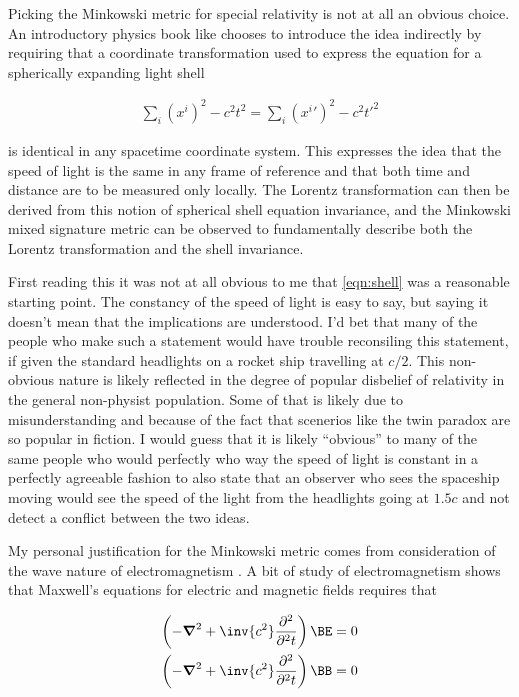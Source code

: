 \documentclass{article}      %
\newcommand{\spacegrad}[0]{\boldsymbol{\nabla}}
\newcommand{\PDsq}[2]{\frac{\partial^2 {#2}}{\partial^2 {#1}}}
\begin{document}
Picking the
Minkowski metric for special relativity is not at all an obvious 
choice.  An introductory physics book like \cite{lewis1965mbp} chooses
to introduce the idea indirectly by requiring that a coordinate transformation
used to express the equation for a spherically expanding light shell

\begin{align}\label{eqn:shell}
\sum_i (x^i)^2 - c^2 t^2 = \sum_i ({x^i}')^2 - c^2 {t'}^2
\end{align}

is identical in any spacetime coordinate system.  This expresses the idea that the speed
of light is the same in any frame of reference and that both time and distance
are to be measured only locally.  The Lorentz transformation can then be derived from
this notion of spherical shell equation invariance, and the Minkowski mixed signature
metric can be observed to fundamentally describe both the Lorentz transformation and the
shell invariance.

First reading this it was not at all obvious to me that \ref{eqn:shell} was a reasonable starting
point.  The constancy of the speed of light is easy to say, but saying it doesn't mean
that the implications are understood.  I'd bet that many of the people who make such a statement
would have trouble reconsiling this statement, if given the standard headlights on a rocket ship
travelling at $c/2$.
This non-obvious nature is likely reflected in the degree of popular disbelief of relativity in the general non-physist population.
Some of that is likely due to misunderstanding and because of the fact that scenerios like the twin paradox are so popular in fiction.
I would guess that it is likely ``obvious'' to many of the same people who would perfectly who way the speed of light is constant
in a perfectly agreeable fashion to also state that an observer who sees the spaceship
moving would see the speed of the light from the headlights going at $1.5 c$ and not detect a conflict between the two ideas.

My personal justification for the Minkowski metric comes from consideration of the wave
nature of electromagnetism \cite{PJLorentzWave}.  A bit of study of electromagnetism shows that Maxwell's equations
for electric and magnetic fields requires that

\begin{align*}
\left(-\spacegrad^2 + \inv{c^2}\PDsq{t}{}\right) \BE &= 0 \\
\left(-\spacegrad^2 + \inv{c^2}\PDsq{t}{}\right) \BB &= 0
\end{align*}
\end{document}

